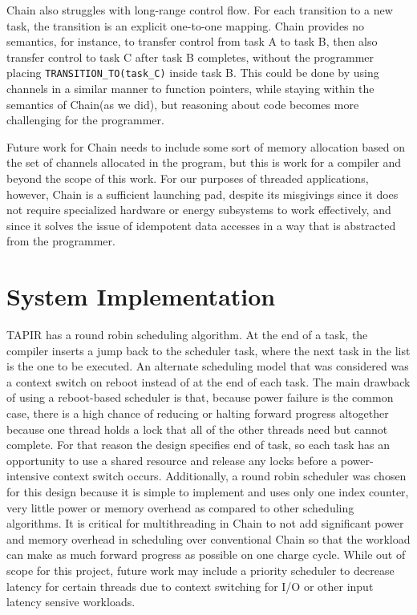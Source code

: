 \documentclass[11pt]{sensys-proc}
\newcommand{\chain}{Chain\xspace}
\begin{document}
\chain also struggles with long-range control flow. For each transition to a
new task, the transition is an explicit one-to-one mapping. \chain provides no
semantics, for instance, to transfer control from task A to task B, then also
transfer control to task C after task B completes, without the programmer
placing \texttt{TRANSITION\_TO(task\_C)} inside task B. This could be done by
using channels in a similar manner to function pointers, while staying within
the semantics of \chain (as we did), but reasoning about code becomes more
challenging for the programmer.


Future work for \chain needs to include some sort of memory allocation based on
the set of channels allocated in the program, but this is work for a compiler
and beyond the scope of this work. For our purposes of threaded applications,
however, \chain is a sufficient launching pad, despite its misgivings since it
does not require specialized hardware or energy subsystems to work effectively,
and since it solves the issue of idempotent data accesses in a way that is
abstracted from the programmer.


\section{System Implementation}
TAPIR has a round robin scheduling algorithm. At the end of a task, the compiler
inserts a jump back to the scheduler task, where the next task in the list is
the one to be executed. An alternate scheduling model that was considered was
a context switch on reboot instead of at the end of each task. The main drawback
of using a reboot-based scheduler is that, because power failure is the common
case, there is a high chance of reducing or halting forward progress altogether
because one thread holds a lock that all of the other threads need but cannot
complete. For that reason the design specifies end of task, so each task has
an opportunity to use a shared resource and release any locks before a power-
intensive context switch occurs. Additionally, a round robin scheduler was
chosen for this design because it is simple to implement and uses only one index counter,
very little power or memory overhead as compared to other scheduling algorithms. It is
critical for multithreading in Chain to not add significant power and memory
overhead in scheduling over conventional Chain so that the workload can
make as much forward progress as possible on one charge cycle. While out of
scope for this project, future work may include a priority scheduler to decrease
latency for certain threads due to context switching for I/O or other input latency
sensive workloads.
\end{document}
